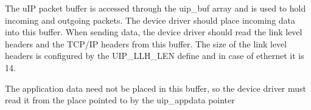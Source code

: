 
The uIP packet buffer is accessed through
the uip\_buf array and is used to hold incoming and outgoing packets.
The device driver should place incoming data into this buffer.
When sending data, the device driver should read the link
level headers and the TCP/IP headers from this buffer.
The size of the link level headers is configured by the UIP\_LLH\_LEN
define and in case of ethernet it is 14.

The application data need not be placed in this buffer, so
the device driver must read it from the place pointed to by the
uip\_appdata pointer %
